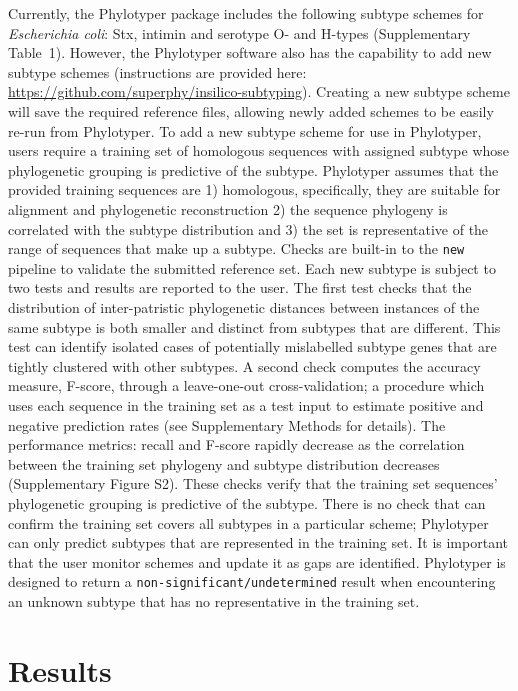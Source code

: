 \documentclass{bioinfo}
\begin{document}
Currently, the Phylotyper package includes the following subtype schemes for \emph{Escherichia coli}: Stx, intimin and serotype O- and H-types  (Supplementary Table~1).
However, the Phylotyper software also has the capability to add new subtype schemes (instructions are provided here: \url{https://github.com/superphy/insilico-subtyping}). 
Creating a new subtype scheme will save the required reference files, allowing newly added schemes to be easily re-run from Phylotyper.
To add a new subtype scheme for use in Phylotyper, users require a training set of homologous sequences with assigned subtype whose phylogenetic grouping is predictive of the subtype.
Phylotyper assumes that the provided training sequences are 1) homologous, specifically, they are suitable for alignment and phylogenetic reconstruction 2) the sequence phylogeny is correlated with the subtype distribution and 3) the set is representative of the range of sequences that make up a subtype.
Checks are built-in to the \texttt{new} pipeline to validate the submitted reference set.
Each new subtype is subject to two tests and results are reported to the user.
The first test checks that the distribution of inter-patristic phylogenetic distances between instances of the same subtype is both smaller and distinct from subtypes that are different.
This test can identify isolated cases of potentially mislabelled subtype genes that are tightly clustered with other subtypes.
A second check computes the accuracy measure, F-score, through a leave-one-out cross-validation; a procedure which uses each sequence in the training set as a test input to estimate positive and negative prediction rates (see Supplementary Methods for details).
The performance metrics: recall and F-score rapidly decrease as the correlation between the training set phylogeny and subtype distribution decreases (Supplementary Figure S2).
These checks verify that the training set sequences' phylogenetic grouping is predictive of the subtype.
There is no check that can confirm the training set covers all subtypes in a particular scheme; Phylotyper can only predict subtypes that are represented in the training set.
It is important that the user monitor schemes and update it as gaps are identified.
Phylotyper is designed to return a \texttt{non-significant/undetermined} result when encountering an unknown subtype that has no representative in the training set.

\section{Results}
\end{document}

